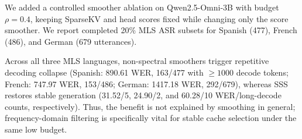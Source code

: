 \vspace{-4mm}
\begin{answer}
We added a controlled smoother ablation on Qwen2.5-Omni-3B with budget $\rho=0.4$, keeping SparseKV and head scores fixed while changing only the score smoother.
We report completed 20\% MLS ASR subsets for Spanish (477), French (486), and German (679 utterances).

\vspace{-3mm}
\begin{table}[h]
\centering
\vspace{-3mm}
\end{table}

\vspace{-3mm}
Across all three MLS languages, non-spectral smoothers trigger repetitive decoding collapse (Spanish: 890.61 WER, 163/477 with $\ge 1000$ decode tokens; French: 747.97 WER, 153/486; German: 1417.18 WER, 292/679), whereas SSS restores stable generation (31.52/5, 24.90/2, and 60.28/10 WER/long-decode counts, respectively).
Thus, the benefit is not explained by smoothing in general; frequency-domain filtering is specifically vital for stable cache selection under the same low budget.
\end{answer}

